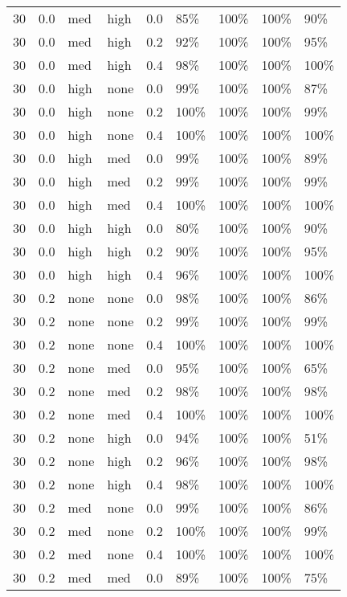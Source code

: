 \begin{longtable}{rrllrllll}
  30 & 0.0 & med & high & 0.0 & 85\% & 100\% & 100\% & 90\% \\ 
  30 & 0.0 & med & high & 0.2 & 92\% & 100\% & 100\% & 95\% \\ 
  30 & 0.0 & med & high & 0.4 & 98\% & 100\% & 100\% & 100\% \\ 
  30 & 0.0 & high & none & 0.0 & 99\% & 100\% & 100\% & 87\% \\ 
  30 & 0.0 & high & none & 0.2 & 100\% & 100\% & 100\% & 99\% \\ 
  30 & 0.0 & high & none & 0.4 & 100\% & 100\% & 100\% & 100\% \\ 
  30 & 0.0 & high & med & 0.0 & 99\% & 100\% & 100\% & 89\% \\ 
  30 & 0.0 & high & med & 0.2 & 99\% & 100\% & 100\% & 99\% \\ 
  30 & 0.0 & high & med & 0.4 & 100\% & 100\% & 100\% & 100\% \\ 
  30 & 0.0 & high & high & 0.0 & 80\% & 100\% & 100\% & 90\% \\ 
  30 & 0.0 & high & high & 0.2 & 90\% & 100\% & 100\% & 95\% \\ 
  30 & 0.0 & high & high & 0.4 & 96\% & 100\% & 100\% & 100\% \\ 
  30 & 0.2 & none & none & 0.0 & 98\% & 100\% & 100\% & 86\% \\ 
  30 & 0.2 & none & none & 0.2 & 99\% & 100\% & 100\% & 99\% \\ 
  30 & 0.2 & none & none & 0.4 & 100\% & 100\% & 100\% & 100\% \\ 
  30 & 0.2 & none & med & 0.0 & 95\% & 100\% & 100\% & 65\% \\ 
  30 & 0.2 & none & med & 0.2 & 98\% & 100\% & 100\% & 98\% \\ 
  30 & 0.2 & none & med & 0.4 & 100\% & 100\% & 100\% & 100\% \\ 
  30 & 0.2 & none & high & 0.0 & 94\% & 100\% & 100\% & 51\% \\ 
  30 & 0.2 & none & high & 0.2 & 96\% & 100\% & 100\% & 98\% \\ 
  30 & 0.2 & none & high & 0.4 & 98\% & 100\% & 100\% & 100\% \\ 
  30 & 0.2 & med & none & 0.0 & 99\% & 100\% & 100\% & 86\% \\ 
  30 & 0.2 & med & none & 0.2 & 100\% & 100\% & 100\% & 99\% \\ 
  30 & 0.2 & med & none & 0.4 & 100\% & 100\% & 100\% & 100\% \\ 
  30 & 0.2 & med & med & 0.0 & 89\% & 100\% & 100\% & 75\% \\ 

\end{longtable}
